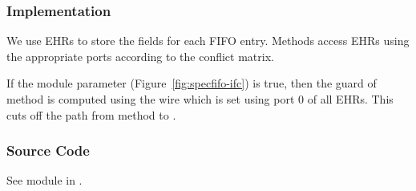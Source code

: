 \subsubsection{Implementation}
We use EHRs to store the fields for each FIFO entry.
Methods access EHRs using the appropriate ports according to the conflict matrix.

If the module parameter  (Figure~\ref{fig:specfifo-ifc}) is true, then the guard of method  is computed using the wire which is set using port 0 of all EHRs.
This cuts off the path from method  to .

\subsubsection{Source Code}
See module  in .

